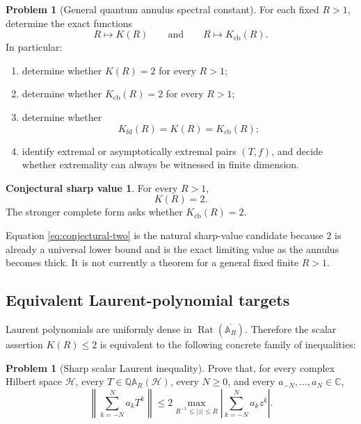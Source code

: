 \documentclass[11pt]{article}
\theoremstyle{definition}
\newtheorem{problem}[theorem]{Problem}
\newtheorem{conjecture}[theorem]{Conjectural sharp value}
\theoremstyle{remark}
\newcommand{\C}{\mathbb C}
\newcommand{\AR}{\mathbb A_R}
\newcommand{\QAR}{\mathbb Q\mathbb A_R}
\newcommand{\Rat}{\operatorname{Rat}}
\newcommand{\cb}{\mathrm{cb}}
\newcommand{\fd}{\mathrm{fd}}
\begin{document}
\begin{problem}[General quantum annulus spectral constant]
\label{prob:general-constant}
For each fixed \(R>1\), determine the exact functions
\[
 R\longmapsto K(R)
 \qquad\text{and}\qquad
 R\longmapsto K_{\cb}(R).
\]
In particular:
\begin{enumerate}
 \item determine whether \(K(R)=2\) for every \(R>1\);
 \item determine whether \(K_{\cb}(R)=2\) for every \(R>1\);
 \item determine whether
 \[
  K_{\fd}(R)=K(R)=K_{\cb}(R);
 \]
 \item identify extremal or asymptotically extremal pairs
 \((T,f)\), and decide whether extremality can always be witnessed in
 finite dimension.
\end{enumerate}
\end{problem}

\begin{conjecture}
\label{conj:sharp-two}
For every \(R>1\),
\begin{equation}
 K(R)=2.
 \label{eq:conjectural-two}
\end{equation}
The stronger complete form asks whether \(K_{\cb}(R)=2\).
\end{conjecture}

Equation \eqref{eq:conjectural-two} is the natural sharp-value
candidate because \(2\) is already a universal lower bound and is the
exact limiting value as the annulus becomes thick.  It is not
currently a theorem for a general fixed finite \(R>1\).

\subsection{Equivalent Laurent-polynomial targets}

Laurent polynomials are uniformly dense in
\(\Rat(\overline{\AR})\).  Therefore the scalar assertion
\(K(R)\leq2\) is equivalent to the following concrete family of
inequalities:
\begin{problem}[Sharp scalar Laurent inequality]
\label{prob:scalar-laurent}
Prove that, for every complex Hilbert space \(\mathcal H\), every
\(T\in\QAR(\mathcal H)\), every \(N\geq0\), and every
\(a_{-N},\ldots,a_N\in\C\),
\begin{equation}
 \left\|
  \sum_{k=-N}^{N}a_kT^k
 \right\|
 \leq
 2
 \max_{R^{-1}\leq|z|\leq R}
 \left|
  \sum_{k=-N}^{N}a_kz^k
 \right|.
 \label{eq:scalar-laurent-target}
\end{equation}
\end{problem}
\end{document}
